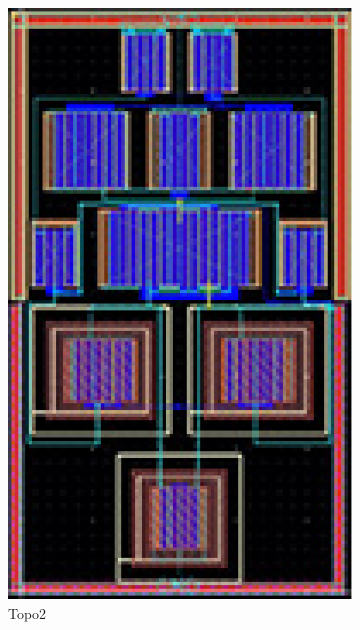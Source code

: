     \begin{figure}[ht]
      \centering
      \begin{subfigure}[t]{0.2\textwidth}
      \includegraphics[width=\textwidth]{Fig/MultTopo_Topo2.eps}
      \caption{Topo2}\label{fig:Topo2}
      \end{subfigure}
      \begin{subfigure}[t]{0.2\textwidth}

\end{subfigure}
\end{figure}
